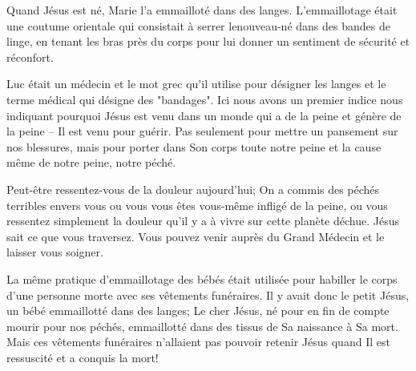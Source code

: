 

Quand Jésus est né, Marie l'a emmailloté dans des langes. L'emmaillotage était une coutume orientale qui consistait à serrer le\linebreak nouveau-né dans des bandes de linge, en tenant les bras près du corps pour lui donner un sentiment de sécurité et réconfort.

Luc était un médecin et le mot grec qu'il utilise pour désigner les langes et le terme médical qui désigne des "bandages". Ici nous avons un premier indice nous indiquant pourquoi Jésus est venu dans un monde qui a de la peine et génère de la peine – Il est venu pour guérir. Pas seulement pour mettre un pansement sur nos blessures, mais pour porter dans Son corps toute notre peine et la cause même de notre peine, notre péché.

Peut-être ressentez-vous de la douleur aujourd'hui; On a commis des péchés terribles envers vous ou vous vous êtes vous-même infligé de la peine, ou vous ressentez simplement la douleur qu'il y a à vivre sur cette planète déchue. Jésus sait ce que vous traversez. Vous pouvez venir auprès du Grand Médecin et le laisser vous soigner.

La même pratique d'emmaillotage des bébés était utilisée pour habiller le corps d'une personne morte avec ses vêtements funéraires. Il y avait donc le petit Jésus, un bébé emmaillotté dans des langes; Le cher Jésus, né pour en fin de compte mourir pour nos péchés, emmaillotté dans des tissus de Sa naissance à Sa mort. Mais ces vêtements funéraires n'allaient pas pouvoir retenir Jésus quand Il est ressuscité et a conquis la mort!



